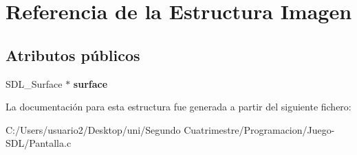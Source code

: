 \hypertarget{struct_imagen}{}\section{Referencia de la Estructura Imagen}
\label{struct_imagen}
\subsection*{Atributos públicos}
\begin{DoxyCompactItemize}
\item 
S\+D\+L\+\_\+\+Surface $\ast$ {\bfseries surface}\hypertarget{struct_imagen_aecc28b21f6138fed7fa9355990031d68}{}\label{struct_imagen_aecc28b21f6138fed7fa9355990031d68}

\end{DoxyCompactItemize}


La documentación para esta estructura fue generada a partir del siguiente fichero\+:\begin{DoxyCompactItemize}
\item 
C\+:/\+Users/usuario2/\+Desktop/uni/\+Segundo Cuatrimestre/\+Programacion/\+Juego-\/\+S\+D\+L/Pantalla.\+c\end{DoxyCompactItemize}
